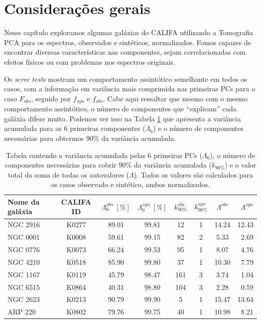 \section{Considerações gerais}

Nesse capítulo exploramos algumas galáxias do CALIFA utilizando a Tomografia PCA para os espectros, observados e
sintéticos, normalizados. Fomos capazes de encontrar diversas características nas componentes, sejam correlacionadas com
efeitos físicos ou com problemas nos espectros originais.

Os {\em scree tests} mostram um comportamento assintótico semelhante em todos os casos, com a informação em variância
mais comprimida nas primeiras PCs para o caso $F_{obs}$, seguido por $f_{syn}$ e $f_{obs}$. Cabe aqui ressaltar que mesmo com
o mesmo comportamento assintótico, o número de componentes que ``explicam'' cada galáxia difere muito. Podemos ver isso
na Tabela \ref{tab:resultLambda} que apresenta a variância acumulada para as 6 primeiras componentes ($\Lambda_6$) e o
número de componentes necessárias para obtermos 90\% da variância acumulada.

\begin{table}
	\caption[Variância acumulada para as galáxias análisadas.]
	{Tabela contendo a variância acumulada pelas 6 primeiras PCs ($\Lambda_6$), o número de componentes necessárias para
	cobrir 90\% da variância acumulada ($k_{90\%}$) e o valor total da soma de todas os autovalores ($\Lambda$). Todos os
	valores são calculados para os casos observado e sintético, ambos normalizados.}
	\begin{tabular}{l c c c c c c r}
		Nome da galáxia & CALIFA ID & $\Lambda_6^{obs}\ [\%]$ & $\Lambda_6^{syn}\ [\%]$ & $k_{90\%}^{obs}$ & $k_{90\%}^{syn}$
		& $\Lambda^{obs}$ & $\Lambda^{syn}$ \\ 
		\midrule
		NGC 2916 & K0277 & 89.01 & 99.81 &  12 & 1 & 14.24 & 12.43 \\
		NGC 0001 & K0008 & 59.61 & 99.15 &  82 & 2 &  5.33 &  2.69 \\
		NGC 0776 & K0073 & 66.24 & 99.53 &  95 & 1 &  8.07 &  4.76 \\
		NGC 4210 & K0518 & 85.90 & 99.80 &  37 & 1 & 10.30 &  7.79 \\
		NGC 1167 & K0119 & 45.79 & 98.47 & 161 & 3 &  3.74 &  1.04 \\
		NGC 6515 & K0864 & 40.31 & 98.80 & 104 & 3 &  2.28 &  0.59 \\
		NGC 2623 & K0213 & 90.79 & 99.90 &   5 & 1 & 15.47 & 13.64 \\
		ARP 220  & K0802 & 79.76 & 99.75 &  40 & 1 & 10.98 &  8.21 \\
	\end{tabular}
	\label{tab:resultLambda}
\end{table}

